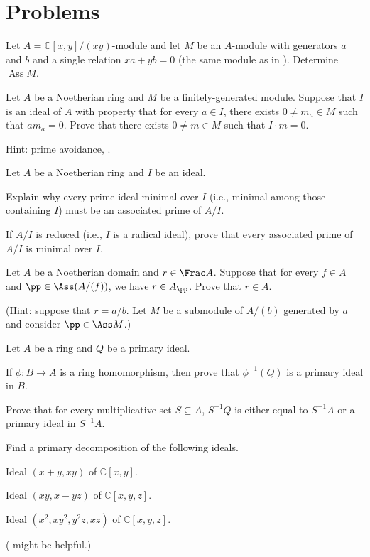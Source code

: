 \section{Problems}
\begin{problem}
Let $A=\mathbb C[x,y]/(xy)$-module and let $M$ be an $A$-module with generators $a$ and $b$ and a single relation $xa+yb=0$ (the same module as in ). Determine $\operatorname{Ass} M$.
\end{problem}
\begin{problem}
Let $A$ be a Noetherian ring and $M$ be a finitely-generated module. Suppose that $I$ is an ideal of $A$ with property that for every $a\in I$, there exists $0\neq m_a\in M$ such that $am_a = 0$. Prove that there exists $0\neq m\in M$ such that $I\cdot m=0$.

Hint: prime avoidance, .
\end{problem}
\begin{problem} 
\label{prob:ass_reduced}
Let $A$ be a Noetherian ring and $I$ be an ideal.
\begin{alphenum}
\item Explain why every prime ideal minimal over $I$ 
(i.e., minimal among those containing $I$)
 must be an associated prime of $A/I$.
\item If $A/I$ is reduced 
(i.e., $I$ is a radical ideal), 
prove that every associated prime of $A/I$ is minimal over $I$. 
\end{alphenum}
\end{problem}
\begin{problem}
\label{prob:ass_denominator}
Let $A$ be a Noetherian domain and $r\in\Frac A$.
Suppose that for every $f\in A$ and $\pp\in \Ass(A/(f))$,
we have $r\in A_\pp$. Prove that $r\in A$.

(Hint: suppose that $r=a/b$. Let $M$ be a submodule of 
$A/(b)$ generated by $a$ and consider $\pp\in \Ass M$.)
\end{problem}
\begin{problem}
\label{prob:primary_quotient_localization}
Let $A$ be a ring and $Q$ be a primary ideal.
\begin{alphenum}
\item If $\phi : B\to A$ is a ring homomorphism,
then prove that $\phi^{-1}(Q)$ is a primary ideal in $B$.
\item Prove that for every multiplicative set 
$S\subseteq A$, $S^{-1}Q$ is either equal to $S^{-1}A$
or a primary ideal in $S^{-1}A$.
\end{alphenum}
\end{problem}
\begin{problem}
Find a primary decomposition of the following ideals.
\begin{alphenum}
\item Ideal $(x+y,xy)$ of $\mathbb C[x,y]$.
\item Ideal $(xy, x-yz)$ of $\mathbb C[x,y,z]$.
\item Ideal $(x^2,xy^2,y^2z,xz)$ of $\mathbb C[x,y,z]$.
\end{alphenum}
( might be helpful.)
\end{problem}
